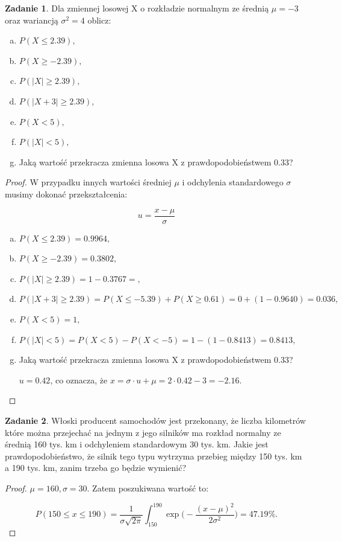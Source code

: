 \documentclass[11pt]{article}
\theoremstyle{definition}
\newtheorem{zadanie}{Zadanie}
\numberwithin{zadanie}{section}
\begin{document}
\begin{zadanie}
    Dla zmiennej losowej X o rozkładzie normalnym ze średnią $\mu = -3$ oraz wariancją $\sigma^2 = 4$ oblicz:

    \begin{enumerate}[a)]
        \item $P (X \leq 2.39),$
        \item $P (X \geq -2.39),$
        \item $P (|X| \geq 2.39),$
        \item $P (|X + 3| \geq 2.39),$
        \item $P (X < 5),$
        \item $P (|X| < 5),$
        \item Jaką wartość przekracza zmienna losowa X z prawdopodobieństwem 0.33?
    \end{enumerate}
\end{zadanie}
\begin{proof}
    W przypadku innych wartości średniej $\mu$ i odchylenia standardowego $\sigma$ musimy dokonać przekształcenia:

    $$u=\frac{x-\mu}\sigma$$

    \begin{enumerate}[a)]
        \item $P (X \leq 2.39) = 0.9964,$
        \item $P (X \geq -2.39) = 0.3802,$
        \item $P (|X| \geq 2.39) = 1-0.3767 = ,$
        \item $P (|X + 3| \geq 2.39) = P(X \leq -5.39) + P(X\geq 0.61) = 0 + (1-0.9640) = 0.036,$
        \item $P (X < 5) = 1,$
        \item $P (|X| < 5) = P(X<5) - P(X<-5) = 1 - (1-0.8413) = 0.8413,$
        \item Jaką wartość przekracza zmienna losowa X z prawdopodobieństwem 0.33?

              $u = 0.42$, co oznacza, że $x = \sigma\cdot u+\mu = 2\cdot 0.42-3=-2.16$.

    \end{enumerate}
\end{proof}

\begin{zadanie}
    Włoski producent samochodów jest przekonany, że liczba kilometrów które można przejechać na jednym z jego
    silników ma rozkład normalny ze średnią 160 tys. km i odchyleniem standardowym 30 tys. km. Jakie jest prawdopodobieństwo,
    że silnik tego typu wytrzyma przebieg między 150 tys. km a 190 tys. km, zanim trzeba go będzie wymienić?
\end{zadanie}
\begin{proof}
    $\mu = 160, \sigma=30$. Zatem poszukiwana wartość to:

    $$P(150\leq x\leq 190) = \frac1{\sigma\sqrt{2\pi}}\int_{150}^{190}\exp\Big(-\frac{(x-\mu)^2}{2\sigma^2}\Big) = 47.19\%.$$
\end{proof}
\end{document}

